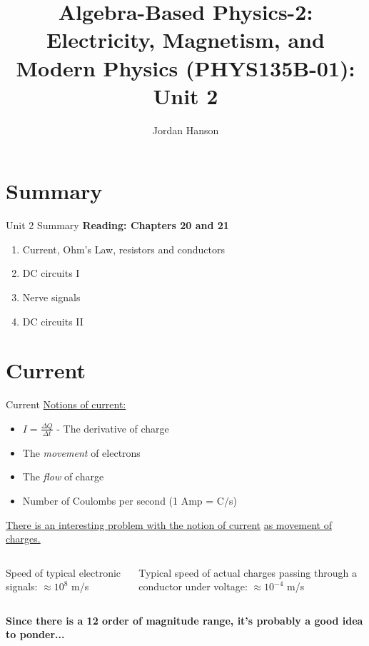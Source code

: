 \documentclass{beamer}
\title{Algebra-Based Physics-2: Electricity, Magnetism, and Modern Physics (PHYS135B-01): Unit 2}
\author{Jordan Hanson}
\institute{Whittier College Department of Physics and Astronomy}
\begin{document}
\maketitle

\section{Summary}

\begin{frame}{Unit 2 Summary}
\textbf{Reading: Chapters 20 and 21}
\begin{enumerate}
\item Current, Ohm's Law, resistors and conductors
\item DC circuits I
\item Nerve signals
\item \alert{DC circuits II}
\end{enumerate}
\end{frame}

\section{Current}

\begin{frame}{Current}
\underline{Notions of current:}
\begin{itemize}
	\item $I = \frac{\Delta Q}{\Delta t}$ - The derivative of charge
	\item The \textit{movement} of electrons
	\item The \textit{flow} of charge
	\item Number of Coulombs per second (1 Amp = C/s)
\end{itemize}
\underline{There is an interesting problem with the notion of current} \underline{as movement of charges.} \\ \vspace{0.5cm}
\begin{columns}[T]
\begin{column}{0.5\textwidth}
Speed of typical electronic signals: $\approx 10^{8}$ m/s
\end{column}
\begin{column}{0.5\textwidth}
Typical speed of actual charges passing through a conductor under voltage: $\approx 10^{-4}$ m/s
\end{column}
\end{columns} \vspace{0.25cm}
\textbf{Since there is a 12 order of magnitude range, it's probably a good idea to ponder...}
\end{frame}
\end{document}
